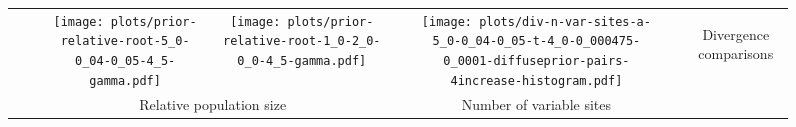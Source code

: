 \documentclass[border=10pt,varwidth=30cm]{standalone}
\begin{document}
\begin{figure}
\begin{tabular}{@{}cccccccc@{}}
        &
        & \texttt{[image: plots/prior-relative-root-5\_0-0\_04-0\_05-4\_5-gamma.pdf]}
        & \texttt{[image: plots/prior-relative-root-1\_0-2\_0-0\_0-4\_5-gamma.pdf]}
        &
        & \texttt{[image: plots/div-n-var-sites-a-5\_0-0\_04-0\_05-t-4\_0-0\_000475-0\_0001-diffuseprior-pairs-4increase-histogram.pdf]}
        & \multicolumn{1}{c|}{}
        & \multirow{5}{*}[16.5em]{\begin{sideways}\Large Divergence comparisons\end{sideways}} \\
        &
        & \multicolumn{2}{c}{\large Relative population size}
        &
        & \multicolumn{1}{c}{\large Number of variable sites}
        &
        & \\
    \end{tabular}
\end{figure}
\end{document}
